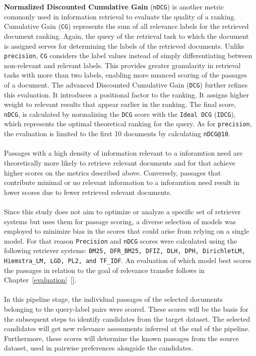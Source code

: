\textbf{Normalized Discounted Cumulative Gain} (\texttt{nDCG}) is another metric commonly used in information retrieval to evaluate the quality of a ranking. Cumulative Gain (\texttt{CG}) represents the sum of all relevance labels for the retrieved document ranking. Again, the query of the retrieval task to which the document is assigned serves for determining the labels of the retrieved documents. Unlike \texttt{precision}, \texttt{CG} considers the label values instead of simply differentiating between non-relevant and relevant labels. This provides greater granularity in retrieval tasks with more than two labels, enabling more nuanced scoring of the passages of a document. The advanced Discounted Cumulative Gain (\texttt{DCG}) further refines this evaluation. It introduces a positional factor to the ranking. It assigns higher weight to relevant results that appear earlier in the ranking. The final score, \texttt{nDCG}, is calculated by normalizing the \texttt{DCG} score with the \texttt{Ideal DCG} (\texttt{IDCG}), which represents the optimal theoretical ranking for the query. As for \texttt{precision}, the evaluation is limited to the first 10 documents by calculating \texttt{nDCG@10}.
\\\\
Passages with a high density of information relevant to a inforamtion need are theoretically more likely to retrieve relevant documents and  for that achieve higher scores on the metrics described above. Conversely, passages that contribute minimal or no relevant information to a inforamtion need result in lower scores due to fewer retrieved relevant documents.
\\\\
Since this study does not aim to optimize or analyze a specific set of retriever systems but uses them for passage scoring, a diverse selection of models was employed to minimize bias in the scores that could arise from relying on a single model. For that reason \texttt{Precision} and \texttt{nDCG} scores were calculated using the following retriever systems: \texttt{BM25, DFR\_BM25, DFIZ, DLH, DPH, DirichletLM, Hiemstra\_LM, LGD, PL2, and TF\_IDF}. An evaluation of which model best scores the passages in relation to the goal of relevance transfer follows in Chapter~\ref{evaluation}~[].
\\\\
In this pipeline stage, the individual passages of the selected documents belonging to the query-label pairs were scored. These scores will be the basis for the subsequent steps to identify candidates from the target dataset. The selected candidates will get new relevance assessments inferred at the end of the pipeline. Furthermore, these scores will determine the known passages from the source dataset, used in pairwise preferences alongside the candidates.


